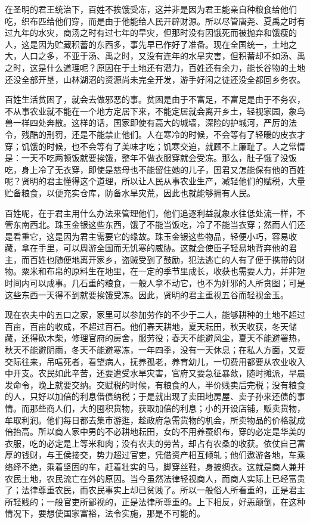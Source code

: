 \documentclass[12pt,UTF-8,openany]{ctexbook}
\begin{document}
\begin{normalsize}
    
    在圣明的君王统治下，百姓不挨饿受冻，这并非是因为君王能亲自种粮食给他们吃，织布匹给他们穿，而是由于他能给人民开辟财源。所以尽管唐尧、夏禹之时有过九年的水灾，商汤之时有过七年的旱灾，但那时没有因饿死而被抛弃和饿瘦的人，这是因为贮藏积蓄的东西多，事先早已作好了准备。现在全国统一，土地之大，人口之多，不亚于汤、禹之时，又没有连年的水旱灾害，但积蓄却不如汤、禹之时，这是什么道理呢？原因在于土地还有潜力，百姓还有余力，能长谷物的土地还没全部开垦，山林湖沼的资源尚未完全开发，游手好闲之徒还没全都回乡务农。
    
    百姓生活贫困了，就会去做邪恶的事。贫困是由于不富足，不富足是由于不务农，不从事农业就不能在一个地方定居下来，不能定居就会离开乡土，轻视家园，象鸟兽一样四处奔散。这样的话，国家即使有高大的城墙，深险的护城河，严厉的法令，残酷的刑罚，还是不能禁止他们。人在寒冷的时候，不会等有了轻暖的皮衣才穿；饥饿的时候，也不会等有了美味才吃；饥寒交迫，就顾不上廉耻了。人之常情是：一天不吃两顿饭就要挨饿，整年不做衣服穿就会受冻。那么，肚子饿了没饭吃，身上冷了无衣穿，即使是慈母也不能留住她的儿子，国君又怎能保有他的百姓呢？贤明的君主懂得这个道理，所以让人民从事农业生产，减轻他们的赋税，大量贮备粮食，以便充实仓库，防备水旱灾荒，因此也就能够拥有人民。
    
    百姓呢，在于君主用什么办法来管理他们，他们追逐利益就象水往低处流一样，不管东南西北。珠玉金银这些东西，饿了不能当饭吃，冷了不能当衣穿；然而人们还是看重它，这是因为君主需要它的缘故。珠玉金银这些物品，轻便小巧，容易收藏，拿在手里，可以周游全国而无饥寒的威胁。这就会使臣子轻易地背弃他的君主，而百姓也随便地离开家乡，盗贼受到了鼓励，犯法逃亡的人有了便于携带的财物。粟米和布帛的原料生在地里，在一定的季节里成长，收获也需要人力，并非短时间内可以成事。几石重的粮食，一般人拿不动它，也不为奸邪的人所贪图；可是这些东西一天得不到就要挨饿受冻。因此，贤明的君主重视五谷而轻视金玉。
    
    现在农夫中的五口之家，家里可以参加劳作的不少于二人，能够耕种的土地不超过百亩，百亩的收成，不超过百石。他们春天耕地，夏天耘田，秋天收获，冬天储藏，还得砍木柴，修理官府的房舍，服劳役；春天不能避风尘，夏天不能避署热，秋天不能避阴雨，冬天不能避寒冻，一年四季，没有一天休息；在私人方面，又要交际往来，吊唁死者，看望病人，抚养孤老，养育幼儿，一切费用都要从农业收入中开支。农民如此辛苦，还要遭受水旱灾害，官府又要急征暴敛，随时摊派，早晨发命令，晚上就要交纳。交赋税的时候，有粮食的人，半价贱卖后完税；没有粮食的人，只好以加倍的利息借债纳税；于是就出现了卖田地房屋、卖子孙来还债的事情。而那些商人们，大的囤积货物，获取加倍的利息；小的开设店铺，贩卖货物，牟取利润。他们每日都去集市游逛，趁政府急需货物的机会，所卖物品的价格就成倍抬高。所以商人家中男的不必耕地耘田，女的不用养蚕织布，穿的必定是华美的衣服，吃的必定是上等米和肉；没有农夫的劳苦，却占有农桑的收获。依仗自己富厚的钱财，与王侯接交，势力超过官吏，凭借资产相互倾轧；他们遨游各地，车乘络绎不绝，乘着坚固的车，赶着壮实的马，脚穿丝鞋，身披绸衣。这就是商人兼并农民土地，农民流亡在外的原因。当今虽然法律轻视商人，而商人实际上已经富贵了；法律尊重农民，而农民事实上却已贫贱了。所以一般俗人所看重的，正是君主所轻贱的；一般官吏所鄙视的，正是法律所尊重的。上下相反，好恶颠倒，在这种情况下，要想使国家富裕，法令实施，那是不可能的。
    

\end{normalsize}
\end{document}
